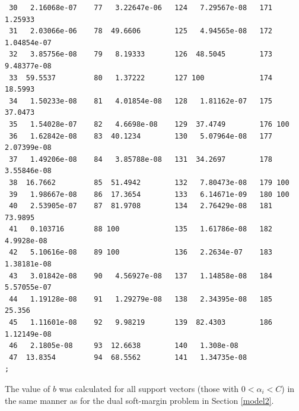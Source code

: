 \documentclass{article}
\begin{document}
\begin{verbatim}
 30   2.16068e-07    77   3.22647e-06   124   7.29567e-08   171   1.25933
 31   2.03066e-06    78  49.6606        125   4.94565e-08   172   1.04854e-07
 32   3.85756e-08    79   8.19333       126  48.5045        173   9.48377e-08
 33  59.5537         80   1.37222       127 100             174  18.5993
 34   1.50233e-08    81   4.01854e-08   128   1.81162e-07   175  37.0473
 35   1.54028e-07    82   4.6698e-08    129  37.4749        176 100
 36   1.62842e-08    83  40.1234        130   5.07964e-08   177   2.07399e-08
 37   1.49206e-08    84   3.85788e-08   131  34.2697        178   3.55846e-08
 38  16.7662         85  51.4942        132   7.80473e-08   179 100
 39   1.98667e-08    86  17.3654        133   6.14671e-09   180 100
 40   2.53905e-07    87  81.9708        134   2.76429e-08   181  73.9895
 41   0.103716       88 100             135   1.61786e-08   182   4.9928e-08
 42   5.10616e-08    89 100             136   2.2634e-07    183   1.38181e-08
 43   3.01842e-08    90   4.56927e-08   137   1.14858e-08   184   5.57055e-07
 44   1.19128e-08    91   1.29279e-08   138   2.34395e-08   185  25.356
 45   1.11601e-08    92   9.98219       139  82.4303        186   1.12149e-08
 46   2.1805e-08     93  12.6638        140   1.308e-08
 47  13.8354         94  68.5562        141   1.34735e-08
;

\end{verbatim}

The value of \(b\) was calculated for all support vectors (those with \(0 < \alpha_i < C\)) in the same manner as for the dual soft-margin problem in Section \ref{model2}.
\end{document}
